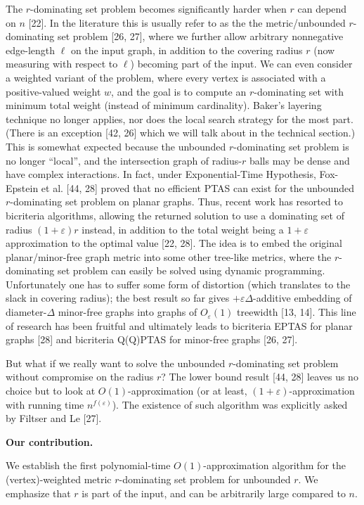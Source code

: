 \documentclass[10pt,a4paper]{article}
\begin{document}
The $r$-dominating set problem becomes significantly harder when $r$ can depend on $n$ [22]. In the literature this is usually refer to as the the metric/unbounded $r$-dominating set problem [26, 27], where we further allow arbitrary nonnegative edge-length $\ell$ on the input graph, in addition to the covering radius $r$ (now measuring with respect to $\ell$) becoming part of the input. We can even consider a weighted variant of the problem, where every vertex is associated with a positive-valued weight $w$, and the goal is to compute an $r$-dominating set with minimum total weight (instead of minimum cardinality). Baker’s layering technique no longer applies, nor does the local search strategy for the most part. (There is an exception [42, 26] which we will talk about in the technical section.) This is somewhat expected because the unbounded $r$-dominating set problem is no longer “local”, and the intersection graph of radius-$r$ balls may be dense and have complex interactions. In fact, under Exponential-Time Hypothesis, Fox-Epstein et al. [44, 28] proved that no efficient PTAS can exist for the unbounded $r$-dominating set problem on planar graphs. Thus, recent work has resorted to bicriteria algorithms, allowing the returned solution to use a dominating set of radius $(1+\varepsilon)r$ instead, in addition to the total weight being a $1+\varepsilon$ approximation to the optimal value [22, 28]. The idea is to embed the original planar/minor-free graph metric into some other tree-like metrics, where the $r$-dominating set problem can easily be solved using dynamic programming. Unfortunately one has to suffer some form of distortion (which translates to the slack in covering radius); the best result so far gives $+\varepsilon\Delta$-additive embedding of diameter-$\Delta$ minor-free graphs into graphs of $O_{\varepsilon}(1)$ treewidth [13, 14]. This line of research has been fruitful and ultimately leads to bicriteria EPTAS for planar graphs [28] and bicriteria Q(Q)PTAS for minor-free graphs [26, 27].
\par
\par
But what if we really want to solve the unbounded $r$-dominating set problem without compromise on the radius $r$? The lower bound result [44, 28] leaves us no choice but to look at $O(1)$-approximation (or at least, $(1+\varepsilon)$-approximation with running time $n^{f(\varepsilon)}$). The existence of such algorithm was explicitly asked by Filtser and Le [27].
\par
\par
\par\medskip\noindent\textbf{Our contribution.}\par
We establish the first polynomial-time $O(1)$-approximation algorithm for the (vertex)-weighted metric $r$-dominating set problem for unbounded $r$. We emphasize that $r$ is part of the input, and can be arbitrarily large compared to $n$.
\par
\par
\end{document}
